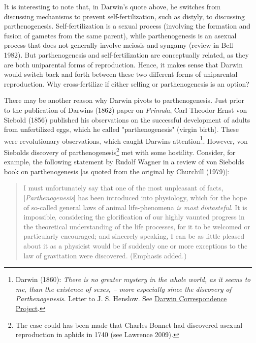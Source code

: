 \documentclass[
  letterpaper,
]{book}
\begin{document}
It is interesting to note that, in Darwin's quote above, he switches
from discussing mechanisms to prevent self-fertilization, such as
distyly, to discussing parthenogenesis. Self-fertilization is a sexual
process (involving the formation and fusion of gametes from the same
parent), while parthenogenesis is an asexual process that does not
generally involve meiosis and syngamy (review in Bell 1982). But
parthenogenesis and self-fertilization are conceptually related, as they
are both uniparental forms of reproduction. Hence, it makes sense that
Darwin would switch back and forth between these two different forms of
uniparental reproduction. Why cross-fertilize if either selfing or
parthenogenesis is an option?

There may be another reason why Darwin pivots to parthenogenesis. Just
prior to the publication of Darwin\textquotesingle s (1862) paper on
\emph{Primula}, Carl Theodor Ernst von Siebold (1856) published his
observations on the successful development of adults from unfertilized
eggs, which he called "parthenogenesis" (virgin birth). These were
revolutionary observations, which caught Darwin\textquotesingle s
attention\footnote{Darwin (1860): \emph{There is no greater mystery in
  the whole world, as it seems to me, than the existence of sexes, --
  more especially since the discovery of Parthenogenesis}. Letter to J.
  S. Henslow. See
  \href{https://www.darwinproject.ac.uk/letter/DCP-LETT-2860.xml}{Darwin
  Correspondence Project}.}. However, von Siebold\textquotesingle s
discovery of parthenogenesis\footnote{The case could has been made that
  Charles Bonnet had discovered asexual reproduction in aphids in 1740
  (see Lawrence 2009).} met with some hostility. Consider, for example,
the following statement by Rudolf Wagner in a review of von
Siebold\textquotesingle s book on parthenogenesis {[}as quoted from the
original by Churchill (1979){]}:

\begin{quote}
I must unfortunately say that one of the most unpleasant of facts,
{[}\emph{Parthenogenesis}{]} has been introduced into physiology, which
for the hope of so-called general laws of animal life-phenomena \emph{is
most distasteful}. It is impossible, considering the glorification of
our highly vaunted progress in the theoretical understanding of the life
processes, for it to be welcomed or particularly encouraged; and
sincerely speaking, I can be as little pleased about it as a physicist
would be if suddenly one or more exceptions to the law of gravitation
were discovered. (Emphasis added.)
\end{quote}
\end{document}
